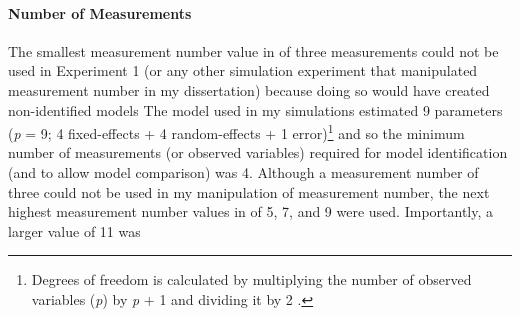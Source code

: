 \documentclass[
12pt, %
twoside,
english]{guelphthesis}
\begin{document}
\hypertarget{number-measurements}{%
\paragraph{Number of Measurements}\label{number-measurements}}

The smallest measurement number value in \textcite{coulombe2016} of three measurements could not be used in Experiment 1 (or any other simulation experiment that manipulated measurement number in my dissertation) because doing so would have created non-identified models The model used in my simulations estimated 9 parameters (\emph{p} = 9; 4 fixed-effects + 4 random-effects + 1 error)\footnote{Degrees of freedom is calculated by multiplying the number of observed variables (\textit{p}) by \textit{p} + 1 and dividing it by 2 \parencite[$\frac{p [p+1]}{2}$;][]{loehlin2017}.} and so the minimum number of measurements (or observed variables) required for model identification (and to allow model comparison) was 4. Although a measurement number of three could not be used in my manipulation of measurement number, the next highest measurement number values in \textcite{coulombe2016} of 5, 7, and 9 were used. Importantly, a larger value of 11 was
\end{document}
